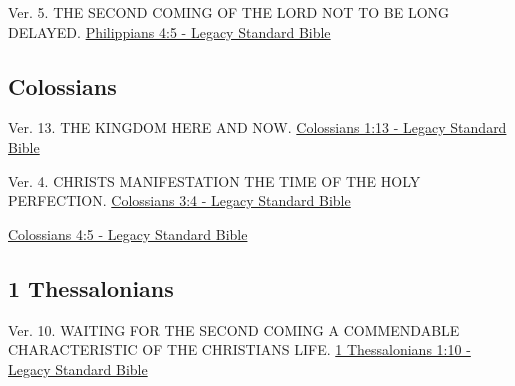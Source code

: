 \documentclass[
  ignorenonframetext,
]{beamer}
\begin{document}
\begin{frame}{4}
\label{section-216}
\begin{block}{Ver. 5. THE SECOND COMING OF THE LORD NOT TO BE LONG
DELAYED.}
\label{ver.-5.-the-second-coming-of-the-lord-not-to-be-long-delayed.}
\href{https://read.lsbible.org/?q=phil4\%3A5}{Philippians 4:5 - Legacy
Standard Bible}
\end{block}
\end{frame}

\subsection{Colossians}\label{colossians}

\begin{frame}{1}
\label{section-217}
\begin{block}{Ver. 13. THE KINGDOM HERE AND NOW.}
\label{ver.-13.-the-kingdom-here-and-now.}
\href{https://read.lsbible.org/?q=col1\%3A13}{Colossians 1:13 - Legacy
Standard Bible}
\end{block}
\end{frame}

\begin{frame}{3}
\label{section-218}
\begin{block}{Ver. 4. CHRIST\textquotesingle S MANIFESTATION THE TIME OF
THE HOLY PERFECTION.}
\label{ver.-4.-christs-manifestation-the-time-of-the-holy-perfection.}
\href{https://read.lsbible.org/?q=col3\%3A4}{Colossians 3:4 - Legacy
Standard Bible}
\end{block}
\end{frame}

\begin{frame}{4}
\label{section-219}
\href{https://read.lsbible.org/?q=col4\%3A5}{Colossians 4:5 - Legacy
Standard Bible}
\end{frame}

\subsection{1 Thessalonians}\label{thessalonians}

\begin{frame}{1}
\label{section-220}
\begin{block}{Ver. 10. WAITING FOR THE SECOND COMING A COMMENDABLE
CHARACTERISTIC OF THE CHRISTIAN\textquotesingle S LIFE.}
\label{ver.-10.-waiting-for-the-second-coming-a-commendable-characteristic-of-the-christians-life.}
\href{https://read.lsbible.org/?q=1th1\%3A10}{1 Thessalonians 1:10 -
Legacy Standard Bible}
\end{block}
\end{frame}
\end{document}

